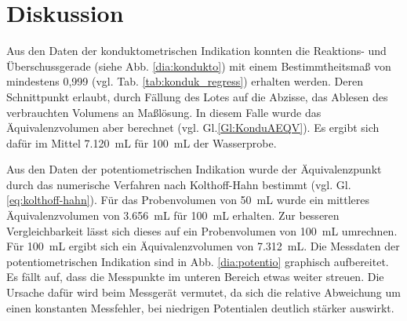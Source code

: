 \section{Diskussion}
\label{sec:diskussion}

%
%

Aus den  Daten der konduktometrischen Indikation konnten die Reaktions- und Überschussgerade (siehe Abb. \ref{dia:kondukto}) mit einem Bestimmtheitsmaß von mindestens 0,999 (vgl. Tab. \ref{tab:konduk_regress}) erhalten werden. Deren Schnittpunkt erlaubt, durch Fällung des Lotes auf die Abzisse, das Ablesen des verbrauchten Volumens an Maßlösung. In diesem Falle wurde das Äquivalenzvolumen aber berechnet (vgl. Gl.\eqref{Gl:KonduAEQV}). Es ergibt sich dafür im Mittel \SI{7,120}{\milli\liter} für \SI{100}{\milli\liter} der Wasserprobe. 

Aus den Daten der potentiometrischen Indikation wurde der Äquivalenzpunkt durch das numerische Verfahren nach Kolthoff-Hahn bestimmt (vgl. Gl. \eqref{eq:kolthoff-hahn}). Für das Probenvolumen von \SI{50}{\milli\liter} wurde ein mittleres Äquivalenzvolumen von \SI{3,656}{\milli\liter} für \SI{100}{\milli\liter} erhalten. Zur besseren Vergleichbarkeit lässt sich dieses auf ein Probenvolumen von \SI{100}{\milli\liter} umrechnen. Für \SI{100}{\milli\liter} ergibt sich ein Äquivalenzvolumen von \SI{7,312}{\milli\liter}. Die Messdaten der potentiometrischen Indikation sind in Abb. \ref{dia:potentio} graphisch aufbereitet. Es fällt auf, dass die Messpunkte im unteren Bereich etwas weiter streuen. Die Ursache dafür wird beim Messgerät vermutet, da sich die relative Abweichung um einen konstanten Messfehler, bei niedrigen Potentialen deutlich stärker auswirkt. 


